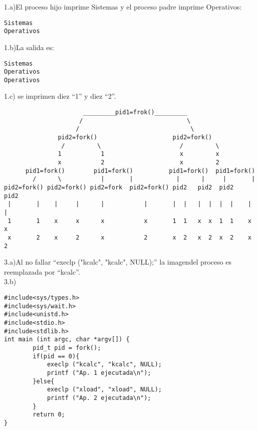 \documentclass{article}
\begin{document}
1.a)El proceso hijo imprime Sistemas y el proceso padre imprime Operativos:
\begin{verbatim}
Sistemas
Operativos
\end{verbatim}

1.b)La salida es:
\begin{verbatim}
Sistemas
Operativos
Operativos
\end{verbatim}

1.c) se imprimen diez ``1'' y diez ``2''.

\begin{verbatim}
                      _________pid1=frok()_________
                     /                             \
                    /                               \
               pid2=fork()                     pid2=fork()
                /         \                      /         \
               1           1                     x         x
               x           2                     x         2
      pid1=fork()        pid1=fork()          pid1=fork()  pid1=fork()
        /      \           |       |            |      |     |       |
pid2=fork() pid2=fork() pid2=fork  pid2=fork() pid2   pid2  pid2    pid2
 |       |    |     |      |           |       |  |   |  |  |  |    |  |
 1       1    x     x      x           x       1  1   x  x  1  1    x  x
 x       2    x     2      x           2       x  2   x  2  x  2    x  2
\end{verbatim}

3.a)Al no fallar ``execlp ("kcalc", "kcalc", NULL);''
la imagendel proceso es reemplazada por ``kcalc''.\\

3.b)
\begin{verbatim}
#include<sys/types.h>
#include<sys/wait.h>
#include<unistd.h>
#include<stdio.h>
#include<stdlib.h>
int main (int argc, char *argv[]) {
        pid_t pid = fork();
        if(pid == 0){
            execlp ("kcalc", "kcalc", NULL);
            printf ("Ap. 1 ejecutada\n");
        }else{
            execlp ("xload", "xload", NULL);
            printf ("Ap. 2 ejecutada\n");
        }
        return 0;
}
\end{verbatim}
\end{document}

